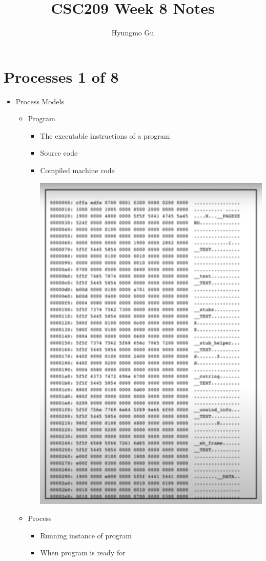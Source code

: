 \documentclass[12pt]{article}
\begin{document}
\title{CSC209 Week 8 Notes}
\author{Hyungmo Gu}
\maketitle

\section*{Processes 1 of 8}

\bigskip

\begin{itemize}
    \item Process Models
    \begin{itemize}
        \item Program
        \begin{itemize}
            \item The executable instructions of a program
            \item Source code
            \item Compiled machine code

            \begin{center}
            \includegraphics[width=0.5\linewidth]{images/week_8_notes_1_1.png}
            \end{center}

        \end{itemize}
        \item Process
        \begin{itemize}
            \item Running instance of program
            \item When program is ready for
        \end{itemize}


\end{itemize}
\end{itemize}
\end{document}
